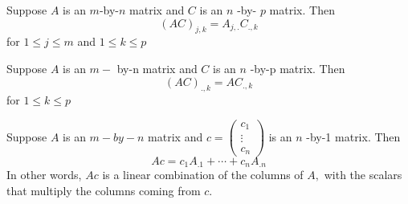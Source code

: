 Suppose $A$ is an $m$-by-$n$ matrix and $C$ is an $n$ -by- $p$ matrix. Then
$$
(A C)_{j, k}=A_{j,.} C_{., k}
$$
for $1 \leq j \leq m$ and $1 \leq k \leq p$

Suppose $A$ is an $m-$ by-n matrix and $C$ is an $n$ -by-p matrix. Then
$$
(A C)_{., k} = A C_{., k}
$$
for $1 \leq k \leq p$

Suppose $A$ is an $m-b y-n$ matrix and $c=\left(\begin{array}{c}{c_{1}} \\ {\vdots} \\ {c_{n}}\end{array}\right)$ is an $n$ -by-1 matrix. Then
$$
A c=c_{1} A_{.1}+\cdots+c_{n} A_{. n}
$$
In other words, $A c$ is a linear combination of the columns of $A,$ with the scalars that multiply the columns coming from $c .$
